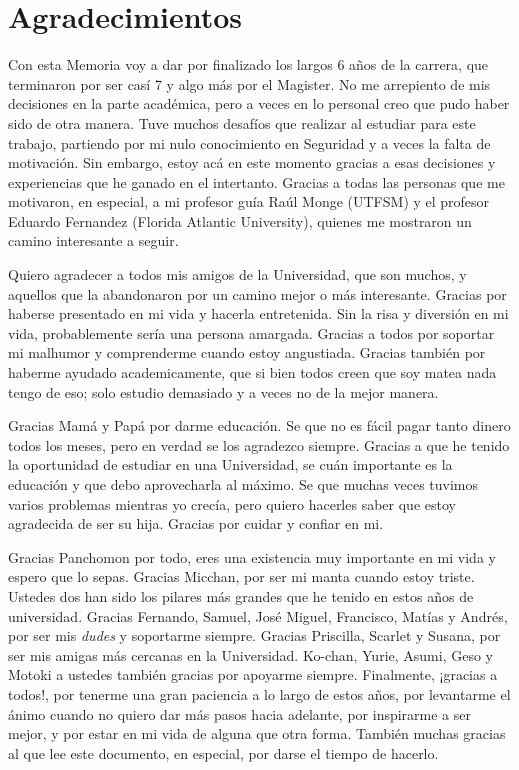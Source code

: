 \chapter*{Agradecimientos}
\label{chap:agrad}

Con esta Memoria voy a dar por finalizado los largos 6 años de la carrera, que terminaron por ser casí 7 y algo más por el Magister. No me arrepiento de mis decisiones en la parte académica, pero a veces en lo personal creo que pudo haber sido de otra manera. Tuve muchos desafíos que realizar al estudiar para este trabajo, partiendo por mi nulo conocimiento en Seguridad y a veces la falta de motivación. Sin embargo, estoy acá en este momento gracias a esas decisiones y experiencias que he ganado en el intertanto. Gracias a todas las personas que me motivaron, en especial, a mi profesor guía Raúl Monge (UTFSM) y el profesor Eduardo Fernandez (Florida Atlantic University), quienes me mostraron un camino interesante a seguir.

Quiero agradecer a todos mis amigos de la Universidad, que son muchos, y aquellos que la abandonaron por un camino mejor o más interesante. Gracias por haberse presentado en mi vida y hacerla entretenida. Sin la risa y diversión en mi vida, probablemente sería una persona amargada. Gracias a todos por soportar mi malhumor y comprenderme cuando estoy angustiada. Gracias también por haberme ayudado academicamente, que si bien todos creen que soy matea nada tengo de eso; solo estudio demasiado y a veces no de la mejor manera.

Gracias Mamá y Papá por darme educación. Se que no es fácil pagar tanto dinero todos los meses, pero en verdad se los agradezco siempre. Gracias a que he tenido la oportunidad de estudiar en una Universidad, se cuán importante es la educación y que debo aprovecharla al máximo. Se que muchas veces tuvimos varios problemas mientras yo crecía, pero quiero hacerles saber que estoy agradecida de ser su hija. Gracias por cuidar y confiar en mi.

Gracias Panchomon por todo, eres una existencia muy importante en mi vida y espero que lo sepas. Gracias Micchan, por ser mi manta cuando estoy triste. Ustedes dos han sido los pilares más grandes que he tenido en estos años de universidad. Gracias Fernando, Samuel, José Miguel, Francisco, Matías y Andrés, por ser mis \textit{dudes} y soportarme siempre. Gracias Priscilla, Scarlet y Susana, por ser mis amigas más cercanas en la Universidad. Ko-chan, Yurie, Asumi, Geso y Motoki a ustedes también gracias por apoyarme siempre. Finalmente, ¡gracias a todos!, por tenerme una gran paciencia a lo largo de estos años, por levantarme el ánimo cuando no quiero dar más pasos hacia adelante, por inspirarme a ser mejor, y por estar en mi vida de alguna que otra forma. También muchas gracias al que lee este documento, en especial, por darse el tiempo de hacerlo.